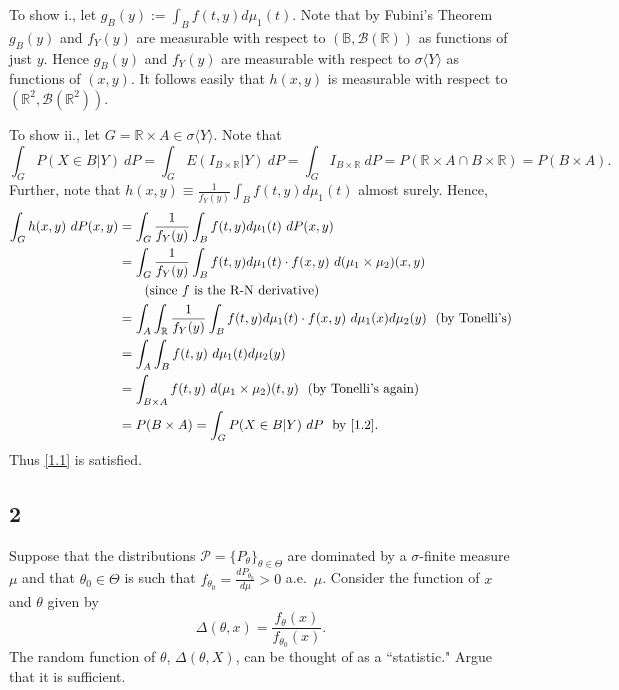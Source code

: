 \documentclass[12pt]{article}
\begin{document}
To show i., let $g_{B}(y) := \int_{B}f(t,y)d\mu_{1}(t)$. Note that by Fubini's Theorem $g_{B}(y)$ and $f_{Y}(y)$ are measurable with respect to 
$(\mathbb{B}, \mathcal{B}(\mathbb{R}))$ as functions of just $y$. Hence $g_{B}(y)$ and $f_{Y}(y)$ are measurable with respect to $\sigma\langle
Y\rangle$ as functions of $(x,y)$. It follows easily that $h(x,y)$ is measurable with respect to $(\mathbb{R}^{2}, \mathcal{B}(\mathbb{R}^{2}))$.

To show ii., let $G = \mathbb{R} \times A \in \sigma \langle Y \rangle$. Note that 
\begin{equation}
  \int_{G}P(X\in B | Y)\ dP = \int_{G}E(I_{B\times \mathbb{R}}|Y)\ dP = \int_{G}I_{B\times \mathbb{R}}\ dP = P(\mathbb{R}\times A \cap B \times
  \mathbb{R}) = P(B\times A).
  \label{1.2}
\end{equation}
Further, note that $h(x,y) \equiv \frac{1}{f_{Y}(y)}\int_{B}f(t,y)d\mu_{1}(t)$ almost surely. Hence,
\begin{align*}
  \int_{G}h(x,y)\ dP(x,y) & = \int_{G}\frac{1}{f_{Y}(y)}\int_{B}f(t,y)d\mu_{1}(t)\ dP(x,y) \\
  & = \int_{G}\frac{1}{f_{Y}(y)}\int_{B}f(t,y)d\mu_{1}(t) \cdot f(x,y)\ d(\mu_{1}\times \mu_{2})(x,y) \\
  & \qquad \text{(since $f$ is the R-N derivative)} \\
  & = \int_{A}\int_{\mathbb{R}}\frac{1}{f_{Y}(y)}\int_{B}f(t,y)d\mu_{1}(t)\cdot f(x,y)\ d\mu_{1}(x)d\mu_{2}(y) \ \ \text{(by Tonelli's)} \\
  & = \int_{A}\int_{B}f(t,y)\ d\mu_{1}(t)d\mu_{2}(y) \\
  & = \int_{B\times A}f(t,y)\ d(\mu_{1}\times \mu_{2})(t,y) \ \ \text{(by Tonelli's again)} \\
  & = P(B\times A) = \int_{G}P(X \in B| Y) \ dP \ \ \text{by \eqref{1.2}.}
\end{align*}
Thus \eqref{1.1} is satisfied.


\subsection*{2}
\begin{tcolorbox}
  Suppose that the distributions $\mathcal{P}=\{P_\theta\}_{\theta \in \Theta}$ are dominated by a $\sigma$-finite measure $\mu$ and that
  $\theta_0\in\Theta$ is such that $f_{\theta_0} = \frac{d P_{\theta_0}}{d \mu}>0$ a.e.~$\mu$.  Consider the function of $x$ and $\theta$ given by
  \[
    \Delta(\theta,x) = \frac{f_\theta(x)}{f_{\theta_0}(x)}.
  \]
  The random function of $\theta$, $\Delta(\theta,X)$, can be thought of as a ``statistic."  Argue that it is sufficient.
\end{tcolorbox}
\end{document}
